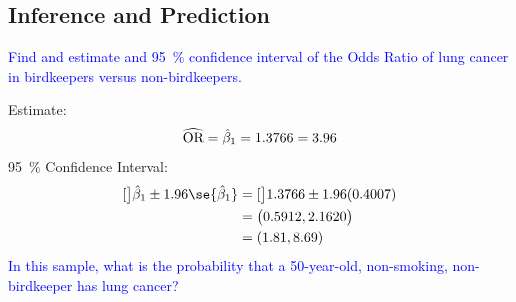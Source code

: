 \documentclass[oneside]{book}\usepackage[]{graphicx}\usepackage[svgnames]{xcolor}
\let\exp\relax%
\begin{document}
\subsection*{Inference and Prediction}
\textcolor{Blue}{Find and estimate and \qty{95}{\percent} confidence interval of the Odds Ratio of lung cancer in
      birdkeepers versus non-birdkeepers.}

Estimate:
\[ \widehat{\text{OR}}=\exp{\hat{\beta}_1}=\exp{1.3766}=3.96 \]
\qty{95}{\percent} Confidence Interval:
\begin{align*}
      \exp[\big]{\hat{\beta}_1\pm 1.96\se{\hat{\beta}_1}}
       & =\exp[\big]{1.3766 \pm 1.96(0.4007)}    \\
       & =\bigl(\exp{0.5912}, \exp{2.1620}\bigr) \\
       & =(1.81, 8.69)
\end{align*}
\textcolor{Blue}{In this sample, what is the probability that a 50-year-old, non-smoking, non-birdkeeper
      has lung cancer?}
\end{document}
